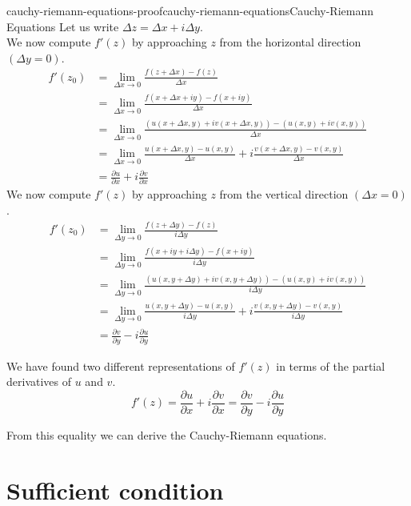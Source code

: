 \documentclass[preview]{standalone}
\begin{document}
\begin{snippetproof}{cauchy-riemann-equations-proof}{cauchy-riemann-equations}{Cauchy-Riemann Equations}
    Let us write \(\Delta z = \Delta x + i\Delta y\). \\
    We now compute \(f'(z)\) by approaching \(z\) from the
    horizontal direction \((\Delta y=0)\).
    \begin{align*}
        f'(z_0) &= \lim_{\Delta x \to 0} \frac{f(z + \Delta x) - f(z)}{\Delta x} \\
        &= \lim_{\Delta x \to 0}
        \frac{f(x + \Delta x + iy) - f(x + iy)}{\Delta x} \\
        &= \lim_{\Delta x \to 0}
        \frac{(u(x + \Delta x, y) + iv(x + \Delta x, y)) - (u(x,y)+iv(x,y))}{\Delta x} \\
        &= \lim_{\Delta x \to 0}
        \frac{u(x + \Delta x, y) - u(x,y)}{\Delta x} + i\frac{v(x + \Delta x, y) - v(x,y)}{\Delta x} \\
        &= \frac{\partial u}{\partial x} + i \frac{\partial v}{\partial x}
    \end{align*}
    We now compute \(f'(z)\) by approaching \(z\) from the
    vertical direction \((\Delta x=0)\).
    \begin{align*}
        f'(z_0) &= \lim_{\Delta y \to 0} \frac{f(z + \Delta y) - f(z)}{i\Delta y} \\
        &= \lim_{\Delta y \to 0}
        \frac{f(x + iy + i\Delta y) - f(x + iy)}{i\Delta y} \\
        &= \lim_{\Delta y \to 0}
        \frac{(u(x, y + \Delta y) + iv(x, y + \Delta y)) - (u(x,y)+iv(x,y))}{i\Delta y} \\
        &= \lim_{\Delta y \to 0}
        \frac{u(x, y + \Delta y) - u(x,y)}{i\Delta y} + i\frac{v(x, y + \Delta y) - v(x,y)}{i\Delta y} \\
        &= \frac{\partial v}{\partial y} -i\frac{\partial u}{\partial y}
    \end{align*}
    
    We have found two different representations of \(f'(z)\) in terms
    of the partial derivatives of \(u\) and \(v\).
    \[
        f'(z)=\frac{\partial u}{\partial x} +i\frac{\partial v}{\partial x}
        = \frac{\partial v}{\partial y} -i \frac{\partial u}{\partial y}
    \]
    
    From this equality we can derive the Cauchy-Riemann equations.
\end{snippetproof}

\section{Sufficient condition}
\end{document}
